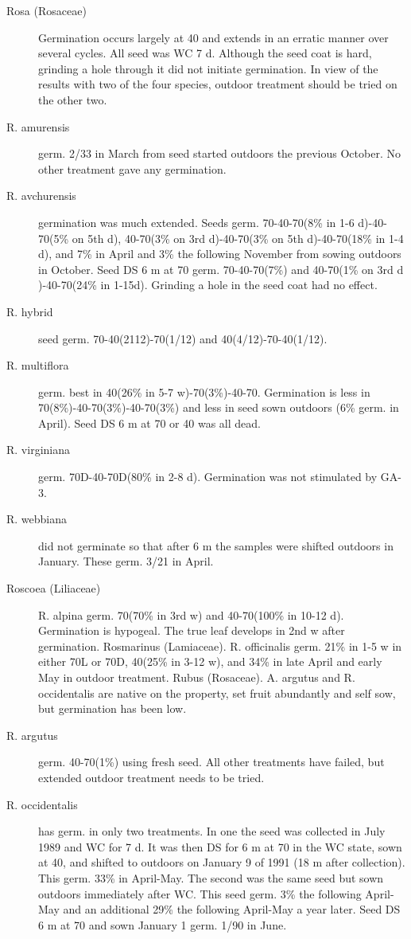 \begin{description}
\item[Rosa (Rosaceae)] Germination occurs largely at 40 and extends in an
erratic manner over several cycles. All seed was WC 7 d. Although the seed coat is
hard, grinding a hole through it did not initiate germination. In view of the results with
two of the four species, outdoor treatment should be tried on the other two.
\item[R. amurensis] germ. 2/33 in March from seed started outdoors the previous
October. No other treatment gave any germination.
\item[R. avchurensis] germination was much extended. Seeds germ. 70-40-70(8\% in
1-6 d)-40-70(5\% on 5th d), 40-70(3\% on 3rd d)-40-70(3\% on 5th d)-40-70(18\% in 1-4
d), and 7\% in April and 3\% the following November from sowing outdoors in October.
Seed DS 6 m at 70 germ. 70-40-70(7\%) and 40-70(1\% on 3rd d )-40-70(24\% in
1-15d). Grinding a hole in the seed coat had no effect.
\item[R. hybrid] seed germ. 70-40(2112)-70(1/12) and 40(4/12)-70-40(1/12).
\item[R. multiflora] germ. best in 40(26\% in 5-7 w)-70(3\%)-40-70. Germination is less
in 70(8\%)-40-70(3\%)-40-70(3\%) and less in seed sown outdoors (6\% germ. in April).
Seed DS 6 m at 70 or 40 was all dead.
\item[R. virginiana] germ. 70D-40-70D(80\% in 2-8 d). Germination was not stimulated
by GA-3.
\item[R. webbiana] did not germinate so that after 6 m the samples were shifted
outdoors in January. These germ. 3/21 in April.

\item[Roscoea (Liliaceae)] R. alpina germ. 70(70\% in 3rd w) and 40-70(100\% in
10-12 d). Germination is hypogeal. The true leaf develops in 2nd w after germination.
Rosmarinus (Lamiaceae). R. officinalis germ. 21\% in 1-5 w in either 70L or
70D, 40(25\% in 3-12 w), and 34\% in late April and early May in outdoor treatment.
Rubus (Rosaceae). A. argutus and R. occidentalis are native on the property,
set fruit abundantly and self sow, but germination has been low.

\item[R. argutus] germ. 40-70(1\%) using fresh seed. All other treatments have failed,
but extended outdoor treatment needs to be tried.
\item[R. occidentalis] has germ. in only two treatments. In one the seed was collected
in July 1989 and WC for 7 d. It was then DS for 6 m at 70 in the WC state, sown at 40,
and shifted to outdoors on January 9 of 1991 (18 m after collection). This germ. 33\%
in April-May. The second was the same seed but sown outdoors immediately after
WC. This seed germ. 3\% the following April-May and an additional 29\% the following
April-May a year later. Seed DS 6 m at 70 and sown January 1 germ. 1/90 in June.


\end{description}
